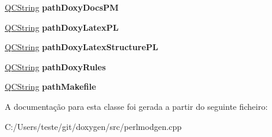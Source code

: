 \begin{DoxyCompactItemize}
\item 
\hypertarget{class_perl_mod_generator_aad8d87d62863659490c0750737b0ae90}{\hyperlink{class_q_c_string}{Q\-C\-String} {\bfseries path\-Doxy\-Docs\-P\-M}}\label{class_perl_mod_generator_aad8d87d62863659490c0750737b0ae90}

\item 
\hypertarget{class_perl_mod_generator_a4d80d31d469eb6554d91cd404a5630dc}{\hyperlink{class_q_c_string}{Q\-C\-String} {\bfseries path\-Doxy\-Latex\-P\-L}}\label{class_perl_mod_generator_a4d80d31d469eb6554d91cd404a5630dc}

\item 
\hypertarget{class_perl_mod_generator_abb1f81e5e026bbb2afdcf6a45e381d13}{\hyperlink{class_q_c_string}{Q\-C\-String} {\bfseries path\-Doxy\-Latex\-Structure\-P\-L}}\label{class_perl_mod_generator_abb1f81e5e026bbb2afdcf6a45e381d13}

\item 
\hypertarget{class_perl_mod_generator_a0406c5ce21214e6047d35aab88f43c2b}{\hyperlink{class_q_c_string}{Q\-C\-String} {\bfseries path\-Doxy\-Rules}}\label{class_perl_mod_generator_a0406c5ce21214e6047d35aab88f43c2b}

\item 
\hypertarget{class_perl_mod_generator_aa369f294c451bb357d50170ea9a30b8e}{\hyperlink{class_q_c_string}{Q\-C\-String} {\bfseries path\-Makefile}}\label{class_perl_mod_generator_aa369f294c451bb357d50170ea9a30b8e}

\end{DoxyCompactItemize}


A documentação para esta classe foi gerada a partir do seguinte ficheiro\-:\begin{DoxyCompactItemize}
\item 
C\-:/\-Users/teste/git/doxygen/src/perlmodgen.\-cpp\end{DoxyCompactItemize}
